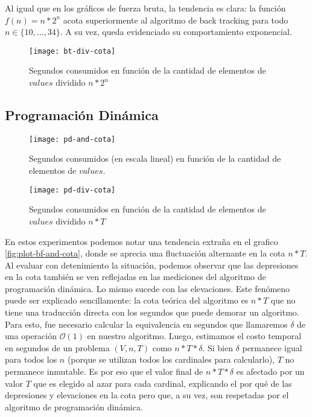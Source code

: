 Al igual que en los gráficos de fuerza bruta, la tendencia es clara: la función $f(n)=n*2^n$ acota superiormente al algoritmo de back tracking para todo $n \in \{10, ..., 34\}$. A su vez, queda evidenciado su comportamiento exponencial.

\begin{figure}[H]
	\centering
	\texttt{[image: bt-div-cota]}
	\caption{\footnotesize Segundos consumidos en función de la cantidad de elementos de $values$ dividido $n*2^n$}
	\label{fig:plot-bt-div-cota}
\end{figure}

\subsection{Programación Dinámica}
\begin{figure}[H]
	\centering
	\begin{minipage}{0.48\textwidth}
		\centering
		\texttt{[image: pd-and-cota]}
		\caption{\footnotesize Segundos consumidos (en escala lineal) en función de la cantidad de elementos de $values$.}
		\label{fig:plot-bf-and-cota}
	\end{minipage}%
	\hspace{0.03\textwidth}
	\begin{minipage}{0.48\textwidth}
		\centering
		\texttt{[image: pd-div-cota]}
		\caption{\footnotesize Segundos consumidos en función de la cantidad de elementos de $values$ dividido $n*T$}
		\label{fig:plot-bf-and-cota-log}
	\end{minipage}%
\end{figure}

En estos experimentos podemos notar una tendencia extraña en el grafico \ref{fig:plot-bf-and-cota}, donde se aprecia una fluctuación alternante en la cota $n*T$. Al evaluar con detenimiento la situación, podemos observar que las depresiones en la cota también se ven reflejadas en las mediciones del algoritmo de programación dinámica. Lo mismo sucede con las elevaciones. Este fenómeno puede ser explicado sencillamente: la cota teórica del algoritmo es $n*T$ que no tiene una traducción directa con los segundos que puede demorar un algoritmo. Para esto, fue necesario calcular la equivalencia en segundos que llamaremos $\delta$ de una operación $\mathcal{O}(1)$ en nuestro algoritmo. Luego, estimamos el costo temporal en segundos de un problema $(V, n, T)$ como $n*T*\delta$. Si bien $\delta$ permanece igual para todos los $n$ (porque se utilizan todos los cardinales para calcularlo), $T$ no permanece inmutable. Es por eso que el valor final de $n*T*\delta$ es afectado por un valor $T$ que es elegido al azar para cada cardinal, explicando el por qué de las depresiones y elevaciones en la cota pero que, a su vez, son respetadas por el algoritmo de programación dinámica.

